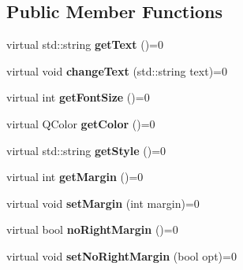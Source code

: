 \subsection*{Public Member Functions}
\begin{DoxyCompactItemize}
\item 
\hypertarget{class_student_1_1i_label_affb9ab06815c87952a4269fcb9b51974}{virtual std\-::string {\bfseries get\-Text} ()=0}\label{class_student_1_1i_label_affb9ab06815c87952a4269fcb9b51974}

\item 
\hypertarget{class_student_1_1i_label_af371838714a918cdc7858dc59cff07d1}{virtual void {\bfseries change\-Text} (std\-::string text)=0}\label{class_student_1_1i_label_af371838714a918cdc7858dc59cff07d1}

\item 
\hypertarget{class_student_1_1i_label_a2466a2ab3e0ee205163bd5595eb5cc5a}{virtual int {\bfseries get\-Font\-Size} ()=0}\label{class_student_1_1i_label_a2466a2ab3e0ee205163bd5595eb5cc5a}

\item 
\hypertarget{class_student_1_1i_label_a23ede86aa204291ddbe55fbbe1ed064d}{virtual Q\-Color {\bfseries get\-Color} ()=0}\label{class_student_1_1i_label_a23ede86aa204291ddbe55fbbe1ed064d}

\item 
\hypertarget{class_student_1_1i_label_a2bb84a18fc4e26c6de3ceef67ffc0fb1}{virtual std\-::string {\bfseries get\-Style} ()=0}\label{class_student_1_1i_label_a2bb84a18fc4e26c6de3ceef67ffc0fb1}

\item 
\hypertarget{class_student_1_1i_label_adb82f01c7b21d9bdf6f9c3b64580d176}{virtual int {\bfseries get\-Margin} ()=0}\label{class_student_1_1i_label_adb82f01c7b21d9bdf6f9c3b64580d176}

\item 
\hypertarget{class_student_1_1i_label_a53bacb363d0255b317044e9f79a4d8d9}{virtual void {\bfseries set\-Margin} (int margin)=0}\label{class_student_1_1i_label_a53bacb363d0255b317044e9f79a4d8d9}

\item 
\hypertarget{class_student_1_1i_label_a839f8a1dd4920a83ef9bdc4f819913c6}{virtual bool {\bfseries no\-Right\-Margin} ()=0}\label{class_student_1_1i_label_a839f8a1dd4920a83ef9bdc4f819913c6}

\item 
\hypertarget{class_student_1_1i_label_a3aa1baee48e88cf42fbd9e74adb115f2}{virtual void {\bfseries set\-No\-Right\-Margin} (bool opt)=0}\label{class_student_1_1i_label_a3aa1baee48e88cf42fbd9e74adb115f2}


\end{DoxyCompactItemize}
